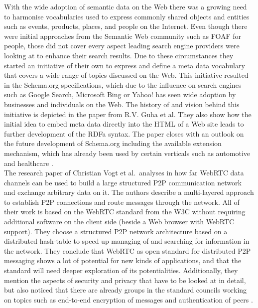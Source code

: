 With the wide adoption of semantic data on the Web there was a growing need to harmonise vocabularies used to express commonly shared objects and entities such as events, products, places, and people on the Internet. Even though there were initial approaches from the Semantic Web community such as \gls{FOAF} for people, those did not cover every aspect leading search engine providers were looking at to enhance their search results. Due to these circumstances they started an initiative of their own to express and define a meta data vocabulary that covers a wide range of topics discussed on the Web. This initiative resulted in the Schema.org specifications, which due to the influence on search engines such as Google Search, Microsoft Bing or Yahoo! has seen wide adoption by businesses and individuals on the Web. The history of and vision behind this initiative is depicted in the paper from R.V. Guha et al. They also show how the initial idea to embed meta data directly into the \gls{HTML} of a Web site leads to further development of the \gls{RDFa} syntax. The paper closes with an outlook on the future development of Schema.org including the available extension mechanism, which has already been used by certain verticals such as automotive and healthcare \citep{guha2016schema}. \\

The research paper of Christian Vogt et al.\ analyses in how far \gls{WebRTC} data channels can be used to build a large structured \gls{P2P} communication network and exchange arbitrary data on it. The authors describe a multi-layered approach to establish \gls{P2P} connections and route messages through the network. All of their work is based on the \gls{WebRTC} standard from the \gls{W3C} without requiring additional software on the client side (beside a Web browser with \gls{WebRTC} support). They choose a structured \gls{P2P} network architecture based on a distributed hash-table to speed up managing of and searching for information in the network. They conclude that \gls{WebRTC} as open standard for distributed \gls{P2P} messaging shows a lot of potential for new kinds of applications, and that the standard will need deeper exploration of its potentialities. Additionally, they mention the aspects of security and privacy that have to be looked at in detail, but also noticed that there are already groups in the standard councils working on topics such as end-to-end encryption of messages and authentication of peers \citep{vogt2013leveraging}. \\

